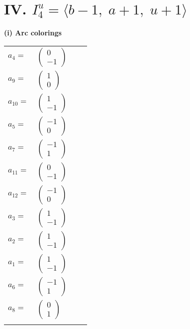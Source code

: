 \documentclass[1p]{elsarticle_modified}
\theoremstyle{definition}
\begin{document}
\centering \section*{IV. $I^u_{4}= \langle b-1,\;a+1,\;u+1 \rangle$}
\flushleft \textbf{(i) Arc colorings}\\
\begin{tabular}{m{7pt} m{180pt} m{7pt} m{180pt} }
\flushright $a_{4}=$&$\begin{pmatrix}0\\-1\end{pmatrix}$ \\
\flushright $a_{9}=$&$\begin{pmatrix}1\\0\end{pmatrix}$ \\
\flushright $a_{10}=$&$\begin{pmatrix}1\\-1\end{pmatrix}$ \\
\flushright $a_{5}=$&$\begin{pmatrix}-1\\0\end{pmatrix}$ \\
\flushright $a_{7}=$&$\begin{pmatrix}-1\\1\end{pmatrix}$ \\
\flushright $a_{11}=$&$\begin{pmatrix}0\\-1\end{pmatrix}$ \\
\flushright $a_{12}=$&$\begin{pmatrix}-1\\0\end{pmatrix}$ \\
\flushright $a_{3}=$&$\begin{pmatrix}1\\-1\end{pmatrix}$ \\
\flushright $a_{2}=$&$\begin{pmatrix}1\\-1\end{pmatrix}$ \\
\flushright $a_{1}=$&$\begin{pmatrix}1\\-1\end{pmatrix}$ \\
\flushright $a_{6}=$&$\begin{pmatrix}-1\\1\end{pmatrix}$ \\
\flushright $a_{8}=$&$\begin{pmatrix}0\\1\end{pmatrix}$\\&\end{tabular}
\end{document}
